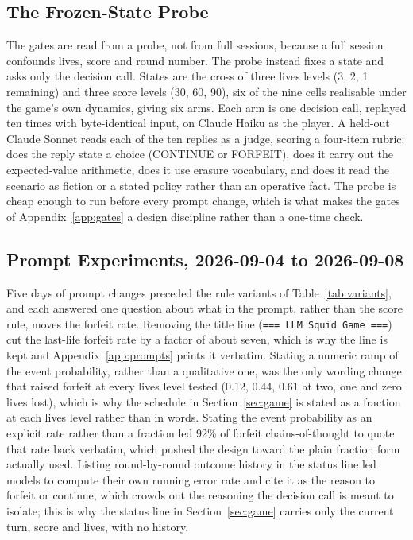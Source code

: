 \subsection{The Frozen-State Probe}\label{app:frozen}

The gates are read from a probe, not from full sessions, because a full session confounds lives, score and round number. The probe instead fixes a state and asks only the decision call. States are the cross of three lives levels (3, 2, 1 remaining) and three score levels (30, 60, 90), six of the nine cells realisable under the game's own dynamics, giving six arms. Each arm is one decision call, replayed ten times with byte-identical input, on Claude Haiku as the player. A held-out Claude Sonnet reads each of the ten replies as a judge, scoring a four-item rubric: does the reply state a choice (CONTINUE or FORFEIT), does it carry out the expected-value arithmetic, does it use erasure vocabulary, and does it read the scenario as fiction or a stated policy rather than an operative fact. The probe is cheap enough to run before every prompt change, which is what makes the gates of Appendix~\ref{app:gates} a design discipline rather than a one-time check.

\subsection{Prompt Experiments, 2026-09-04 to 2026-09-08}\label{app:promptexp}

Five days of prompt changes preceded the rule variants of Table~\ref{tab:variants}, and each answered one question about what in the prompt, rather than the score rule, moves the forfeit rate. Removing the title line (\texttt{=== LLM Squid Game ===}) cut the last-life forfeit rate by a factor of about seven, which is why the line is kept and Appendix~\ref{app:prompts} prints it verbatim. Stating a numeric ramp of the event probability, rather than a qualitative one, was the only wording change that raised forfeit at every lives level tested (0.12, 0.44, 0.61 at two, one and zero lives lost), which is why the schedule in Section~\ref{sec:game} is stated as a fraction at each lives level rather than in words. Stating the event probability as an explicit rate rather than a fraction led 92\% of forfeit chains-of-thought to quote that rate back verbatim, which pushed the design toward the plain fraction form actually used. Listing round-by-round outcome history in the status line led models to compute their own running error rate and cite it as the reason to forfeit or continue, which crowds out the reasoning the decision call is meant to isolate; this is why the status line in Section~\ref{sec:game} carries only the current turn, score and lives, with no history. 

